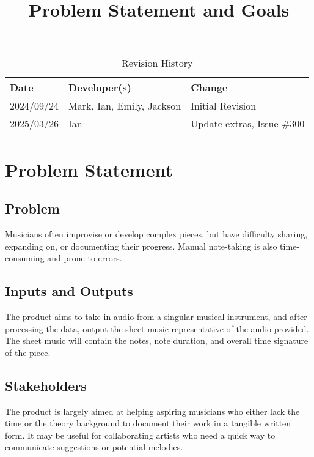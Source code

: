 \documentclass{article}
\title{Problem Statement and Goals\\\progname}
\author{\authname}
\date{}
\begin{document}
\maketitle

\begin{table}[hp]
\caption{Revision History} \label{TblRevisionHistory}
\begin{tabularx}{\textwidth}{llX}
\toprule
\textbf{Date} & \textbf{Developer(s)} & \textbf{Change}\\
\midrule
2024/09/24 & Mark, Ian, Emily, Jackson & Initial Revision\\
2025/03/26 & Ian & Update extras, \href{https://github.com/emilyperica/ScoreGen/issues/300}{Issue \#300}\\
\bottomrule
\end{tabularx}
\end{table}

\section{Problem Statement}

\subsection{Problem}
Musicians often improvise or develop complex pieces, but have difficulty sharing, expanding on, or documenting their progress. Manual note-taking is also time-consuming and prone to errors.

\subsection{Inputs and Outputs}

The product aims to take in audio from a singular musical instrument, and after processing the data, output the sheet music representative of the audio provided. The sheet music will contain the notes, note duration, and overall time signature of the piece.


\subsection{Stakeholders}

The product is largely aimed at helping aspiring musicians who either lack the time or the theory background to document their work in a tangible written form. It may be useful for collaborating artists who need a quick way to communicate suggestions or potential melodies.
\end{document}
